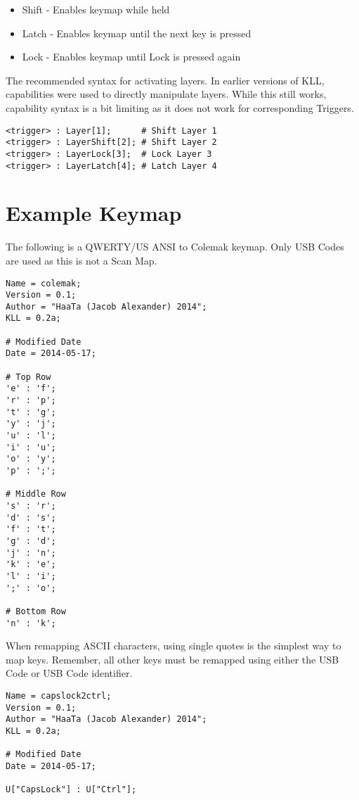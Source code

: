 \documentclass{kiibohd-template}
\begin{document}
\begin{itemize}
	\item Shift - Enables keymap while held
	\item Latch - Enables keymap until the next key is pressed
	\item Lock - Enables keymap until Lock is pressed again
\end{itemize}

The recommended syntax for activating layers.
In earlier versions of KLL, capabilities were used to directly manipulate layers.
While this still works, capability syntax is a bit limiting as it does not work for corresponding Triggers.

\begin{lstlisting}
<trigger> : Layer[1];      # Shift Layer 1
<trigger> : LayerShift[2]; # Shift Layer 2
<trigger> : LayerLock[3];  # Lock Layer 3
<trigger> : LayerLatch[4]; # Latch Layer 4
\end{lstlisting}


\section{Example Keymap}

The following is a QWERTY/US ANSI to Colemak keymap.
Only USB Codes are used as this is not a Scan Map.

\begin{lstlisting}
Name = colemak;
Version = 0.1;
Author = "HaaTa (Jacob Alexander) 2014";
KLL = 0.2a;

# Modified Date
Date = 2014-05-17;

# Top Row
'e' : 'f';
'r' : 'p';
't' : 'g';
'y' : 'j';
'u' : 'l';
'i' : 'u';
'o' : 'y';
'p' : ';';

# Middle Row
's' : 'r';
'd' : 's';
'f' : 't';
'g' : 'd';
'j' : 'n';
'k' : 'e';
'l' : 'i';
';' : 'o';

# Bottom Row
'n' : 'k';
\end{lstlisting}

When remapping ASCII characters, using single quotes is the simplest way to map keys.
Remember, all other keys must be remapped using either the USB Code or USB Code identifier.

\begin{lstlisting}
Name = capslock2ctrl;
Version = 0.1;
Author = "HaaTa (Jacob Alexander) 2014";
KLL = 0.2a;

# Modified Date
Date = 2014-05-17;

U["CapsLock"] : U["Ctrl"];
\end{lstlisting}
\end{document}
